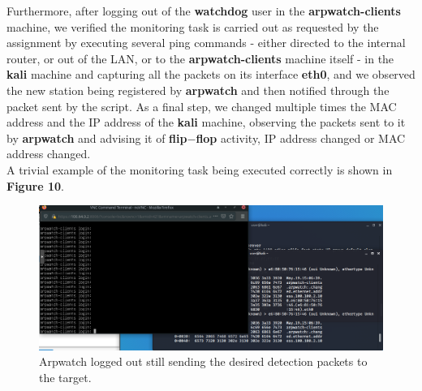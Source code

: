 Furthermore, after logging out of the \textbf{watchdog} user in the \textbf{arpwatch-clients} machine, we verified the monitoring task is carried out as requested by the assignment by executing several ping commands - either directed to the internal router, or out of the LAN, or to the \textbf{arpwatch-clients} machine itself - in the \textbf{kali} machine and capturing all the packets on its interface \textbf{eth0}, and we observed the new station being registered by \textbf{arpwatch} and then notified through the packet sent by the script. As a final step, we changed multiple times the MAC address and the IP address of the \textbf{kali} machine, observing the packets sent to it by \textbf{arpwatch} and advising it of \textbf{flip$-$flop} activity, IP address changed or MAC address changed.\\
A trivial example of the monitoring task being executed correctly is shown in \textbf{Figure 10}.\\
\begin{figure}[htpb]
\centering
\includegraphics[width=1\textwidth]{detection_while_logged_out.png}
\caption[a]{Arpwatch logged out still sending the desired detection packets to the target.}\label{fig:9}
\end{figure}
